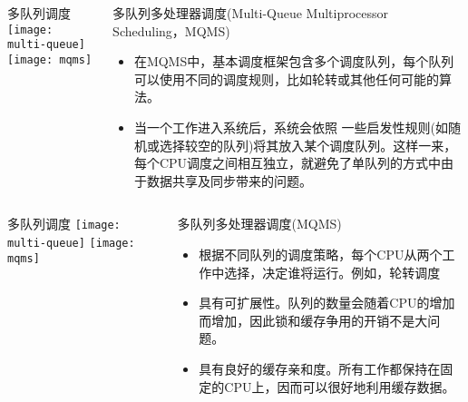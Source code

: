 \begin{frame}
	\begin{columns}
		\begin{column}{.5\textwidth}
			\Large \centering
			多队列调度
			\texttt{[image: multi-queue]}
			\texttt{[image: mqms]}	
		\end{column}
		
		\begin{column}{.5\textwidth}
			\large
			多队列多处理器调度(Multi-Queue Multiprocessor Scheduling，MQMS) \\
			\normalsize
			\begin{itemize}
			\item 在MQMS中，基本调度框架包含多个调度队列，每个队列可以使用不同的调度规则，比如轮转或其他任何可能的算法。
			
			\item 当一个工作进入系统后，系统会依照 一些启发性规则(如随机或选择较空的队列)将其放入某个调度队列。这样一来，每个CPU调度之间相互独立，就避免了单队列的方式中由于数据共享及同步带来的问题。
			\end{itemize}
		\end{column}
	\end{columns}
\end{frame}


\begin{frame}
	\begin{columns}
		\begin{column}{.5\textwidth}
			\Large \centering
			多队列调度
			\texttt{[image: multi-queue]}
			\texttt{[image: mqms]}	
		\end{column}
		
		\begin{column}{.5\textwidth}
			\large
			多队列多处理器调度(MQMS) 
			\normalsize
			\begin{itemize}
			\item 根据不同队列的调度策略，每个CPU从两个工作中选择，决定谁将运行。例如，轮转调度
			\item 具有可扩展性。队列的数量会随着CPU的增加而增加，因此锁和缓存争用的开销不是大问题。
			\item 具有良好的缓存亲和度。所有工作都保持在固定的CPU上，因而可以很好地利用缓存数据。
			\end{itemize}
		\end{column}
	\end{columns}
\end{frame}


